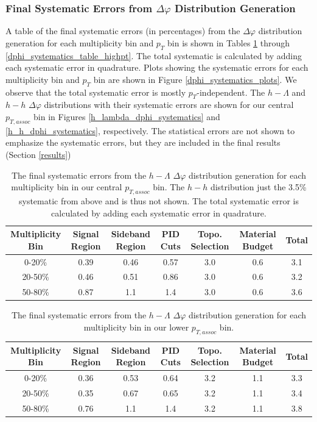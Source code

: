 \documentclass[ALICE,manyauthors]{ALICE_analysis_notes}
\begin{document}
\subsubsection{Final Systematic Errors from $\Delta\varphi$ Distribution Generation}
\label{final_dphi_systematics}
A table of the final systematic errors (in percentages) from the $\Delta\varphi$ distribution generation for each multiplicity bin and $p_{T}$ bin is shown in Tables \ref{dphi_systematics_table} through \ref{dphi_systematics_table_highpt}. The total systematic is calculated by adding each systematic error in quadrature. Plots showing the systematic errors for each multiplicity bin and $p_{T}$ bin are shown in Figure \ref{dphi_systematics_plots}. We observe that the total systematic error is mostly $p_{T}$-independent. The $h-\Lambda$ and $h-h$ $\Delta\varphi$ distributions with their systematic errors are shown for our central $p_{T, assoc}$ bin in Figures \ref{h_lambda_dphi_systematics} and \ref{h_h_dphi_systematics}, respectively. The statistical errors are not shown to emphasize the systematic errors, but they are included in the final results (Section \ref{results})


\begin{table}[ht]
\centering
\begin{tabular}{|c||c|c|c|c|c||c|}
\hline
Multiplicity Bin & Signal Region & Sideband Region & PID Cuts & Topo. Selection & Material Budget & Total \\
\hline
0-20\% & 0.39 & 0.46 & 0.57 & 3.0 & 0.6 & 3.1 \\
20-50\% & 0.46 & 0.51 & 0.86 & 3.0  & 0.6 & 3.2 \\
50-80\% & 0.87 & 1.1 & 1.4 & 3.0  & 0.6 & 3.6 \\
\hline
\end{tabular}
\caption{The final systematic errors from the $h-\Lambda$ $\Delta\varphi$ distribution generation for each multiplicity bin in our central $p_{T, assoc}$ bin. The $h-h$ distribution just the 3.5\% systematic from above and is thus not shown. The total systematic error is calculated by adding each systematic error in quadrature.}
\label{dphi_systematics_table}
\end{table}

\begin{table}[ht]
\centering
\begin{tabular}{|c||c|c|c|c|c||c|}
\hline
Multiplicity Bin & Signal Region & Sideband Region & PID Cuts & Topo. Selection & Material Budget & Total \\
\hline
0-20\% & 0.36 & 0.53 & 0.64 & 3.2 & 1.1 & 3.3 \\
20-50\% & 0.35 & 0.67 & 0.65 & 3.2  & 1.1 & 3.4 \\
50-80\% & 0.76 & 1.1 & 1.4 & 3.2  & 1.1 & 3.8 \\
\hline
\end{tabular}
\caption{The final systematic errors from the $h-\Lambda$ $\Delta\varphi$ distribution generation for each multiplicity bin in our lower $p_{T, assoc}$ bin.}
\label{dphi_systematics_table_lowpt}
\end{table}
\end{document}
